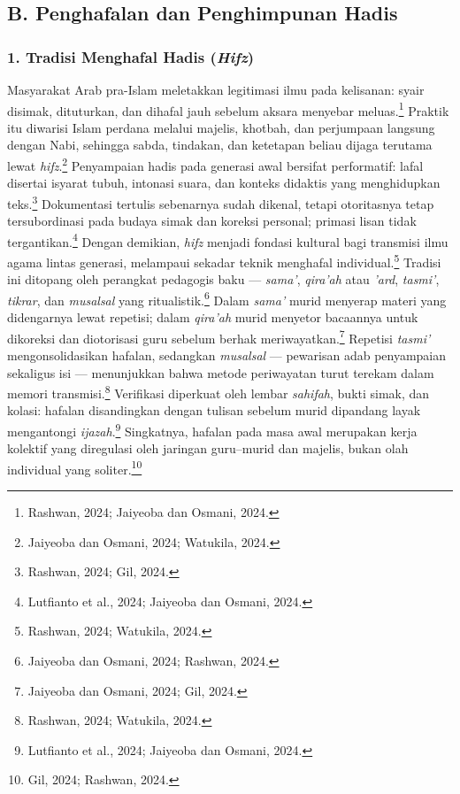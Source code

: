 \subsection*{B. Penghafalan dan Penghimpunan Hadis}

\subsubsection*{1. Tradisi Menghafal Hadis (\textit{Hifz})}

Masyarakat Arab pra-Islam meletakkan legitimasi ilmu pada kelisanan: syair disimak, dituturkan, dan dihafal jauh sebelum aksara menyebar meluas.\footnote{Rashwan, 2024; Jaiyeoba dan Osmani, 2024.} Praktik itu diwarisi Islam perdana melalui majelis, khotbah, dan perjumpaan langsung dengan Nabi, sehingga sabda, tindakan, dan ketetapan beliau dijaga terutama lewat \textit{hifz}.\footnote{Jaiyeoba dan Osmani, 2024; Watukila, 2024.} Penyampaian hadis pada generasi awal bersifat performatif: lafal disertai isyarat tubuh, intonasi suara, dan konteks didaktis yang menghidupkan teks.\footnote{Rashwan, 2024; Gil, 2024.} Dokumentasi tertulis sebenarnya sudah dikenal, tetapi otoritasnya tetap tersubordinasi pada budaya simak dan koreksi personal; primasi lisan tidak tergantikan.\footnote{Lutfianto et al., 2024; Jaiyeoba dan Osmani, 2024.} Dengan demikian, \textit{hifz} menjadi fondasi kultural bagi transmisi ilmu agama lintas generasi, melampaui sekadar teknik menghafal individual.\footnote{Rashwan, 2024; Watukila, 2024.} Tradisi ini ditopang oleh perangkat pedagogis baku --- \textit{sama'}, \textit{qira'ah} atau \textit{'ard}, \textit{tasmi'}, \textit{tikrar}, dan \textit{musalsal} yang ritualistik.\footnote{Jaiyeoba dan Osmani, 2024; Rashwan, 2024.} Dalam \textit{sama'} murid menyerap materi yang didengarnya lewat repetisi; dalam \textit{qira'ah} murid menyetor bacaannya untuk dikoreksi dan diotorisasi guru sebelum berhak meriwayatkan.\footnote{Jaiyeoba dan Osmani, 2024; Gil, 2024.} Repetisi \textit{tasmi'} mengonsolidasikan hafalan, sedangkan \textit{musalsal} --- pewarisan adab penyampaian sekaligus isi --- menunjukkan bahwa metode periwayatan turut terekam dalam memori transmisi.\footnote{Rashwan, 2024; Watukila, 2024.} Verifikasi diperkuat oleh lembar \textit{sahifah}, bukti simak, dan kolasi: hafalan disandingkan dengan tulisan sebelum murid dipandang layak mengantongi \textit{ijazah}.\footnote{Lutfianto et al., 2024; Jaiyeoba dan Osmani, 2024.} Singkatnya, hafalan pada masa awal merupakan kerja kolektif yang diregulasi oleh jaringan guru--murid dan majelis, bukan olah individual yang soliter.\footnote{Gil, 2024; Rashwan, 2024.}


